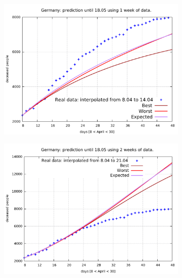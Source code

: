 \documentclass[8pt]{article}
\begin{document}
\begin{figure}[h!]
  \centering
  \begin{subfigure}[b]{0.45\linewidth}
  \includegraphics[width=\linewidth]{../simulations/de/8-14/8-14.pdf}
  \end{subfigure}
  \begin{subfigure}[b]{0.45\linewidth}
    \includegraphics[width=\linewidth]{../simulations/de/8-21/8-21.pdf}
  \end{subfigure}
  \begin{subfigure}[b]{0.45\linewidth}

\end{subfigure}
\end{figure}
\end{document}
